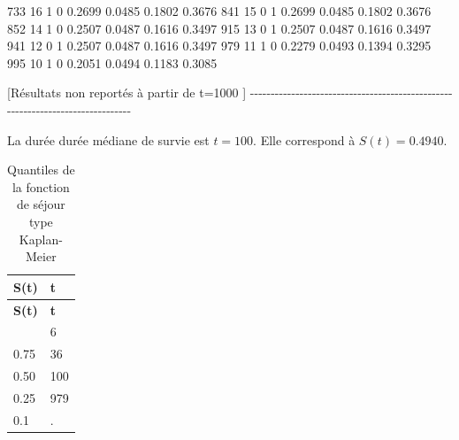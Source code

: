\documentclass[
  12pt,
  letterpaper,
  DIV=11,
  numbers=noendperiod,
  onepage,
  openany]{scrreprt}
\newenvironment{Shaded}{\begin{snugshade}}{\end{snugshade}}
\newcommand{\DecValTok}[1]{\textcolor[rgb]{0.86,0.86,0.80}{#1}}
\newcommand{\FloatTok}[1]{\textcolor[rgb]{0.75,0.75,0.82}{#1}}
\newcommand{\NormalTok}[1]{\textcolor[rgb]{0.80,0.80,0.80}{#1}}
\newcommand{\OtherTok}[1]{\textcolor[rgb]{0.94,0.94,0.56}{#1}}
\newcommand{\SpecialCharTok}[1]{\textcolor[rgb]{0.86,0.64,0.64}{#1}}
\begin{document}
\begin{Shaded}
\begin{Highlighting}[]
   \DecValTok{733}       \DecValTok{16}      \DecValTok{1}      \DecValTok{0}             \FloatTok{0.2699}    \FloatTok{0.0485}     \FloatTok{0.1802}    \FloatTok{0.3676}
   \DecValTok{841}       \DecValTok{15}      \DecValTok{0}      \DecValTok{1}             \FloatTok{0.2699}    \FloatTok{0.0485}     \FloatTok{0.1802}    \FloatTok{0.3676}
   \DecValTok{852}       \DecValTok{14}      \DecValTok{1}      \DecValTok{0}             \FloatTok{0.2507}    \FloatTok{0.0487}     \FloatTok{0.1616}    \FloatTok{0.3497}
   \DecValTok{915}       \DecValTok{13}      \DecValTok{0}      \DecValTok{1}             \FloatTok{0.2507}    \FloatTok{0.0487}     \FloatTok{0.1616}    \FloatTok{0.3497}
   \DecValTok{941}       \DecValTok{12}      \DecValTok{0}      \DecValTok{1}             \FloatTok{0.2507}    \FloatTok{0.0487}     \FloatTok{0.1616}    \FloatTok{0.3497}
   \DecValTok{979}       \DecValTok{11}      \DecValTok{1}      \DecValTok{0}             \FloatTok{0.2279}    \FloatTok{0.0493}     \FloatTok{0.1394}    \FloatTok{0.3295}
   \DecValTok{995}       \DecValTok{10}      \DecValTok{1}      \DecValTok{0}             \FloatTok{0.2051}    \FloatTok{0.0494}     \FloatTok{0.1183}    \FloatTok{0.3085}

\NormalTok{[Résultats non reportés à partir de t}\OtherTok{=}\DecValTok{1000}\NormalTok{ ]}
\SpecialCharTok{{-}{-}{-}{-}{-}{-}{-}{-}{-}{-}{-}{-}{-}{-}{-}{-}{-}{-}{-}{-}{-}{-}{-}{-}{-}{-}{-}{-}{-}{-}{-}{-}{-}{-}{-}{-}{-}{-}{-}{-}{-}{-}{-}{-}{-}{-}{-}{-}{-}{-}{-}{-}{-}{-}{-}{-}{-}{-}{-}{-}{-}{-}{-}{-}{-}{-}{-}{-}{-}{-}{-}{-}{-}{-}{-}{-}{-}{-}{-}}
\end{Highlighting}
\end{Shaded}

La durée durée médiane de survie est \(t=100\). Elle correspond à
\(S(t)=0.4940\).

\begin{longtable}[]{@{}ll@{}}
\caption{Quantiles de la fonction de séjour type
Kaplan-Meier}\tabularnewline
\toprule\noalign{}
\textbf{S(t)} & \textbf{t} \\
\midrule\noalign{}
\endfirsthead
\toprule\noalign{}
\textbf{S(t)} & \textbf{t} \\
\midrule\noalign{}
\endhead
\bottomrule\noalign{}
\endlastfoot
0.90 & 6 \\
0.75 & 36 \\
0.50 & 100 \\
0.25 & 979 \\
0.1 & . \\
\end{longtable}
\end{document}
